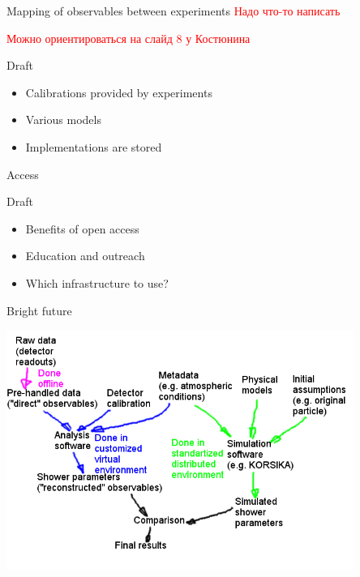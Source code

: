 \documentclass[18pt]{beamer}
\begin{document}
\begin{frame}{Mapping of observables between experiments}
\textcolor{red}{Надо что-то написать}

\textcolor{red}{Можно ориентироваться на слайд 8 у Костюнина}

\begin{block}{Draft}
  \begin{itemize}
    \item Calibrations provided by experiments
    \item Various models
    \item Implementations are stored
  \end{itemize}
\end{block}
\end{frame}

\begin{frame}{Access}
\begin{block}{Draft}
  \begin{itemize}
    \item Benefits of open access
    \item Education and outreach
    \item Which infrastructure to use?
  \end{itemize}
\end{block}
\end{frame}

\begin{frame}{Bright future}
\begin{center}
\includegraphics[width=0.85\textwidth]{pics/img00.png}
\end{center}
\end{frame}
\end{document}
